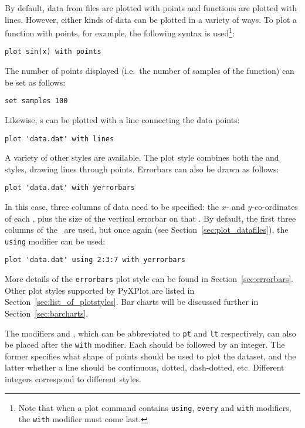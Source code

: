 By default, data from files are plotted with points and functions are plotted
with lines. However, either kinds of data can be plotted in a variety of ways.
To plot a function with points, for example, the following syntax is
used\footnote{Note that when a plot command contains {\tt using}, {\tt every}
and {\tt with} modifiers, the {\tt with} modifier must come
last.}:

\begin{verbatim}
plot sin(x) with points
\end{verbatim}

\noindent The number of points displayed (i.e.\ the number of samples of the
function) can be set as follows:

\begin{verbatim}
set samples 100
\end{verbatim}

\noindent Likewise, \datafile s can be plotted with a line connecting the data
points:

\begin{verbatim}
plot 'data.dat' with lines
\end{verbatim}

A variety of other styles are available. The  plot style
combines both the  and  styles, drawing lines
through points. Errorbars can also be drawn as follows:

\begin{verbatim}
plot 'data.dat' with yerrorbars
\end{verbatim}

\noindent In this case, three columns of data need to be specified: the $x$-
and $y$-co-ordinates of each \datapoint, plus the size of the vertical errorbar
on that \datapoint. By default, the first three columns of the \datafile\ are
used, but once again (see Section~\ref{sec:plot_datafiles}), the {\tt using}
modifier can be used:

\begin{verbatim}
plot 'data.dat' using 2:3:7 with yerrorbars
\end{verbatim}

More details of the {\tt errorbars} plot style can be found in
Section~\ref{sec:errorbars}. Other plot styles supported by PyXPlot are listed in
Section~\ref{sec:list_of_plotstyles}. Bar charts will be discussed further in
Section~\ref{sec:barcharts}.

\label{sec:pointtype}
The modifiers  and , which can be
abbreviated to {\tt pt} and {\tt lt} respectively, can also be placed after the
{\tt with} modifier. Each should be followed by an integer.  The former
specifies what shape of points should be used to plot the dataset, and the
latter whether a line should be continuous, dotted, dash-dotted, etc.
Different integers correspond to different styles.

